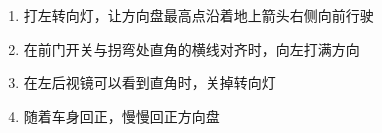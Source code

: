 \begin{enumerate}
    \item 打左转向灯，让方向盘最高点沿着地上箭头右侧向前行驶
    \item 在前门开关与拐弯处直角的横线对齐时，向左打满方向
    \item 在左后视镜可以看到直角时，关掉转向灯
    \item 随着车身回正，慢慢回正方向盘
\end{enumerate}